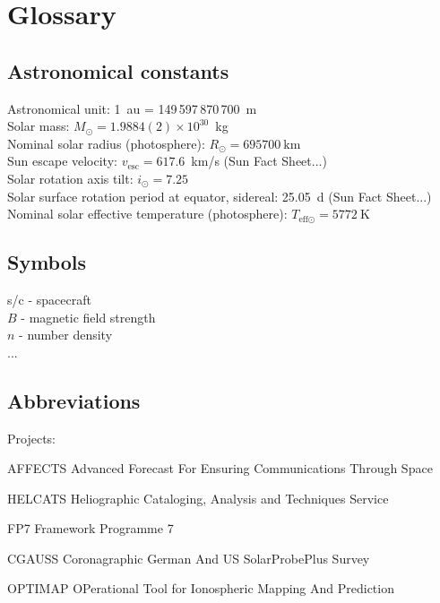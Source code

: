 \chapter{Glossary}
\label{chap:glossary}

\section{Astronomical constants}
\label{sec:astronomical_constants}

Astronomical unit: 1~au = 149\,597\,870\,700~m \citep{USNO2015}\\ %
Solar mass: $M_\odot = 1.9884(2)\times10^{30}$~kg \citep{USNO2015}\\ %
Nominal solar radius (photosphere): $R_\odot = \SI{695700}{\km}$ \citep{Mamajek2015}\\ %
Sun escape velocity: $v_\text{esc} = 617.6$~km/s (Sun Fact Sheet...)\\
Solar rotation axis tilt: $i_\odot = 7.25$\textdegree{} \citep{USNO2015}\\ %
Solar surface rotation period at equator, sidereal: 25.05~d (Sun Fact Sheet...)\\
Nominal solar effective temperature (photosphere): $T_{\text{eff}\odot} = \SI{5772}{\kelvin}$ \citep{Mamajek2015}\\



\section{Symbols}
\label{sec:symbols}

s/c - spacecraft\\
$B$ - magnetic field strength\\
$n$ - number density\\
...\\


\section{Abbreviations}
\label{sec:abbreviations}

Projects:
\begin{description*}
	\item[AFFECTS] Advanced Forecast For Ensuring Communications Through Space
	\item[HELCATS] Heliographic Cataloging, Analysis and Techniques Service
	\item[FP7] Framework Programme 7
	\item[CGAUSS] Coronagraphic German And US SolarProbePlus Survey
	\item[OPTIMAP] OPerational Tool for Ionospheric Mapping And Prediction
\end{description*}

